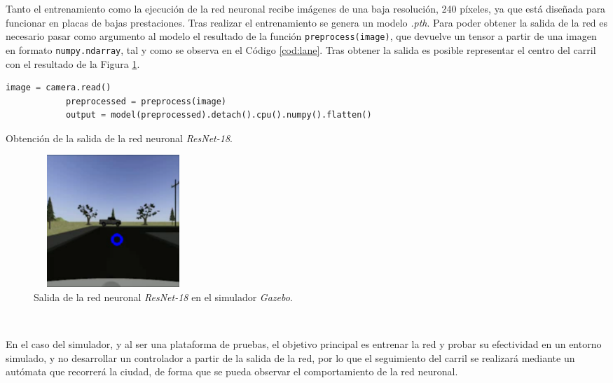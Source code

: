 Tanto el entrenamiento como la ejecución de la red neuronal recibe imágenes de una baja resolución, 240 píxeles, ya que está diseñada para funcionar en placas de bajas prestaciones. Tras realizar el entrenamiento se genera un modelo \textit{.pth}. Para poder obtener la salida de la red es necesario pasar como argumento al modelo el resultado de la función \verb|preprocess(image)|, que devuelve un tensor a partir de una imagen en formato \verb|numpy.ndarray|, tal y como se observa en el Código \ref{cod:lane}. Tras obtener la salida es posible representar el centro del carril con el resultado de la Figura \ref{fig:outputnnsim}.\\

\begin{code}[h]
	\begin{lstlisting}[language=Python]
			image = camera.read()
    		preprocessed = preprocess(image)
    		output = model(preprocessed).detach().cpu().numpy().flatten()
	\end{lstlisting}
	\caption[Obtención de la salida de la red neuronal \textit{ResNet-18}.]{Obtención de la salida de la red neuronal \textit{ResNet-18}.}
	\label{cod:lane}
\end{code}

\begin{figure} [h!]
	\begin{center}
		\includegraphics[width=6cm, height=5cm]{figs/outputNNsim}
	\end{center}
	\caption{Salida de la red neuronal \textit{ResNet-18} en el simulador \textit{Gazebo}.}
	\label{fig:outputnnsim}
\end{figure}\

En el caso del simulador, y al ser una plataforma de pruebas, el objetivo principal es entrenar la red y probar su efectividad en un entorno simulado, y no desarrollar un controlador a partir de la salida de la red, por lo que el seguimiento del carril se realizará mediante un autómata que recorrerá la ciudad, de forma que se pueda observar el comportamiento de la red neuronal.\\

